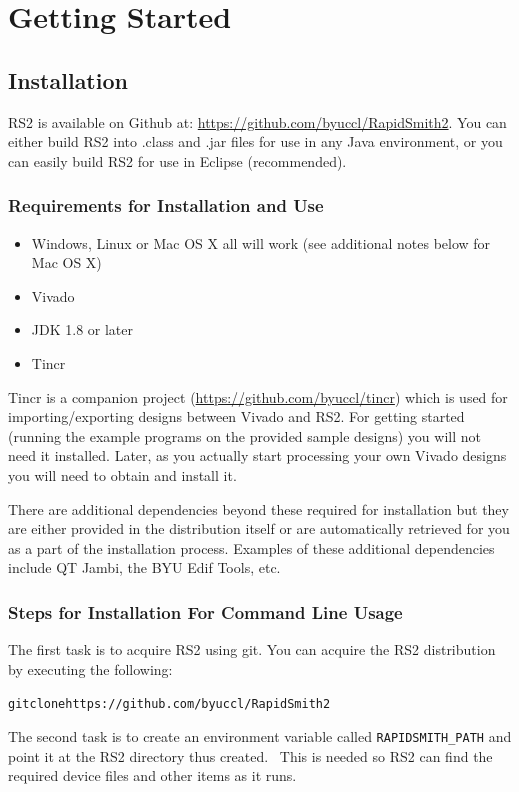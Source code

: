 \documentclass[12pt]{article}
\newcommand{\env}[1]{{\texttt{#1}}}
\newenvironment{code}{\begin{center} \begin{minipage}{6in} \noindent \begin{alltt}}{\end{alltt} \end{minipage} \end{center}}
\begin{document}
\section{Getting Started}

\subsection{Installation}

RS2 is available on Github at: \url{https://github.com/byuccl/RapidSmith2}.  
You can either build RS2 into .class and .jar files for use in any Java
environment, or you can easily build RS2 for use in Eclipse (recommended).

\subsubsection{Requirements for Installation and Use}
\begin{itemize}
  \item Windows, Linux or Mac OS X all will work (see additional notes below for
  Mac OS X)
  \item Vivado
  \item JDK 1.8 or later
  \item Tincr 
\end{itemize}

Tincr is a companion project (\url{https://github.com/byuccl/tincr}) which 
is used for importing/exporting designs between Vivado
and RS2.  For getting started (running the example programs on the
provided sample designs) you will not need it installed.
Later, as you  actually start processing your own Vivado designs you will need
to obtain and install it.  

There are additional dependencies beyond these required for installation but
they are either provided in the distribution itself or are
automatically retrieved for you as a part of the installation process. 
Examples of these additional dependencies include QT Jambi, the BYU Edif Tools,
etc.
 
\subsubsection{Steps for Installation For Command Line Usage}
The first task is to acquire RS2 using git.
You can acquire the RS2 distribution by executing the following: 
\vspace{-0.15in}  \begin{code}
git clone https://github.com/byuccl/RapidSmith2
\end{code} 
The second task is to create an environment variable called
\env{RAPIDSMITH\_PATH} and point it at the RS2 directory thus created.  This is
needed so RS2 can find the required device files and other items as it runs.
\end{document}
